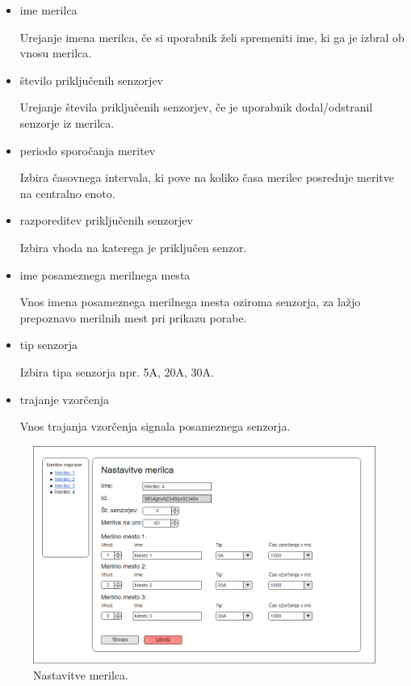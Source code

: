 \documentclass[12pt,a4paper,titlepage,openany]{report}
\begin{document}
\begin{itemize}
\item ime merilca
\begin{flushleft}
Urejanje imena merilca, če si uporabnik želi spremeniti ime, ki ga je izbral ob vnosu merilca.
\end{flushleft}
\item število priključenih senzorjev
\begin{flushleft}
Urejanje števila priključenih senzorjev, če je uporabnik dodal/odstranil senzorje iz merilca.
\end{flushleft}
\item periodo sporočanja meritev
\begin{flushleft}
Izbira časovnega intervala, ki pove na koliko časa merilec posreduje meritve na centralno enoto.
\end{flushleft}
\item razporeditev priključenih senzorjev
\begin{flushleft}
Izbira vhoda na katerega je priključen senzor.
\end{flushleft}
\item ime posameznega merilnega mesta
\begin{flushleft}
Vnos imena posameznega merilnega mesta oziroma senzorja, za lažjo prepoznavo merilnih mest pri prikazu porabe.
\end{flushleft}
\item tip senzorja
\begin{flushleft}
Izbira tipa senzorja npr. 5A, 20A, 30A.
\end{flushleft}
\item trajanje vzorčenja
\begin{flushleft}
Vnos trajanja vzorčenja signala posameznega senzorja.
\end{flushleft}
\end{itemize}


\begin{figure}[H]
\begin{center}
\includegraphics[width=1\linewidth]{Slike/UrejanjeMerilca.png}
\end{center}
\caption{Nastavitve merilca.}\label{slika:UrejanjeMerilca}
\end{figure}
\end{document}
